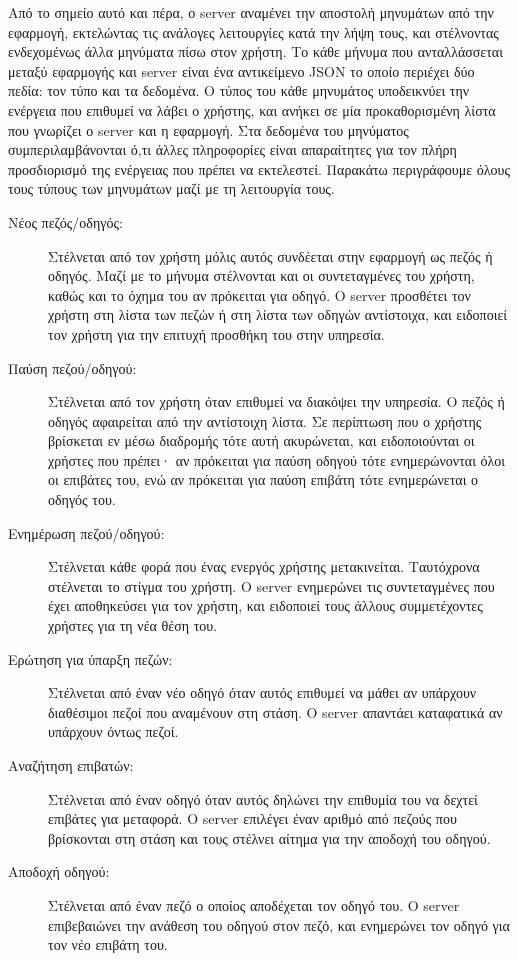 \documentclass[../thesis.tex]{subfiles}
\begin{document}
Από το σημείο αυτό και πέρα, ο server αναμένει την αποστολή μηνυμάτων από την εφαρμογή, εκτελώντας τις ανάλογες λειτουργίες κατά την λήψη τους, και στέλνοντας ενδεχομένως άλλα μηνύματα πίσω στον χρήστη.
Το κάθε μήνυμα που ανταλλάσσεται μεταξύ εφαρμογής και server είναι ένα αντικείμενο JSON το οποίο περιέχει δύο πεδία: τον τύπο και τα δεδομένα.
Ο τύπος του κάθε μηνυμάτος υποδεικνύει την ενέργεια που επιθυμεί να λάβει ο χρήστης, και ανήκει σε μία προκαθορισμένη λίστα που γνωρίζει ο server και η εφαρμογή.
Στα δεδομένα του μηνύματος συμπεριλαμβάνονται ό,τι άλλες πληροφορίες είναι απαραίτητες για τον πλήρη προσδιορισμό της ενέργειας που πρέπει να εκτελεστεί.
Παρακάτω περιγράφουμε όλους τους τύπους των μηνυμάτων μαζί με τη λειτουργία τους.

\begin{description}
    \item[Νέος πεζός/οδηγός:] Στέλνεται από τον χρήστη μόλις αυτός συνδέεται στην εφαρμογή ως πεζός ή οδηγός. Μαζί με το μήνυμα στέλνονται και οι συντεταγμένες του χρήστη, καθώς και το όχημα του αν πρόκειται για οδηγό. Ο server προσθέτει τον χρήστη στη λίστα των πεζών ή στη λίστα των οδηγών αντίστοιχα, και ειδοποιεί τον χρήστη για την επιτυχή προσθήκη του στην υπηρεσία.
    \item[Παύση πεζού/οδηγού:] Στέλνεται από τον χρήστη όταν επιθυμεί να διακόψει την υπηρεσία. Ο πεζός ή οδηγός αφαιρείται από την αντίστοιχη λίστα. Σε περίπτωση που ο χρήστης βρίσκεται εν μέσω διαδρομής τότε αυτή ακυρώνεται, και ειδοποιούνται οι χρήστες που πρέπει· αν πρόκειται για παύση οδηγού τότε ενημερώνονται όλοι οι επιβάτες του, ενώ αν πρόκειται για παύση επιβάτη τότε ενημερώνεται ο οδηγός του.
    \item[Ενημέρωση πεζού/οδηγού:] Στέλνεται κάθε φορά που ένας ενεργός χρήστης μετακινείται. Ταυτόχρονα στέλνεται το στίγμα του χρήστη. Ο server ενημερώνει τις συντεταγμένες που έχει αποθηκεύσει για τον χρήστη, και ειδοποιεί τους άλλους συμμετέχοντες χρήστες για τη νέα θέση του.
    \item[Ερώτηση για ύπαρξη πεζών:] Στέλνεται από έναν νέο οδηγό όταν αυτός επιθυμεί να μάθει αν υπάρχουν διαθέσιμοι πεζοί που αναμένουν στη στάση. Ο server απαντάει καταφατικά αν υπάρχουν όντως πεζοί.
    \item[Αναζήτηση επιβατών:] Στέλνεται από έναν οδηγό όταν αυτός δηλώνει την επιθυμία του να δεχτεί επιβάτες για μεταφορά. Ο server επιλέγει έναν αριθμό από πεζούς που βρίσκονται στη στάση και τους στέλνει αίτημα για την αποδοχή του οδηγού.
    \item[Αποδοχή οδηγού:] Στέλνεται από έναν πεζό ο οποίος αποδέχεται τον οδηγό του. Ο server επιβεβαιώνει την ανάθεση του οδηγού στον πεζό, και ενημερώνει τον οδηγό για τον νέο επιβάτη του.

\end{description}
\end{document}
